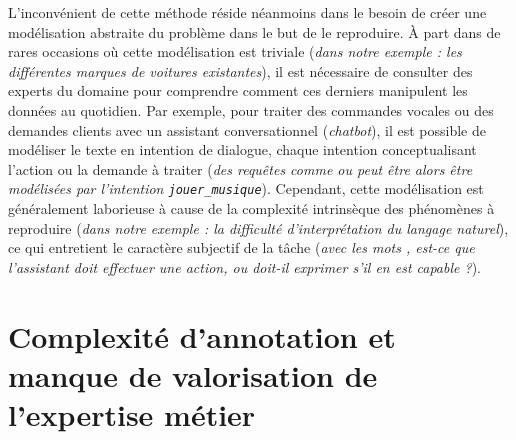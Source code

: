 		L'inconvénient de cette méthode réside néanmoins dans le besoin de créer une modélisation abstraite du problème dans le but de le reproduire.
		À part dans de rares occasions où cette modélisation est triviale (\textit{dans notre exemple : les différentes marques de voitures existantes}), il est nécessaire de consulter des experts du domaine pour comprendre comment ces derniers manipulent les données au quotidien.
		Par exemple, pour traiter des commandes vocales ou des demandes clients avec un assistant conversationnel (\textit{chatbot}), il est possible de modéliser le texte en intention de dialogue, chaque intention conceptualisant l'action ou la demande à traiter (\textit{des requêtes comme  ou  peut être alors être modélisées par l'intention \texttt{jouer\_musique}}).
		Cependant, cette modélisation est généralement laborieuse à cause de la complexité intrinsèque des phénomènes à reproduire (\textit{dans notre exemple : la difficulté d'interprétation du langage naturel}), ce qui entretient le caractère subjectif de la tâche (\textit{avec les mots , est-ce que l'assistant doit effectuer une action, ou doit-il exprimer s'il en est capable ?}).
		
		
	\section*{Complexité d'annotation et manque de valorisation de l'expertise métier}
		
		
		
		
		
